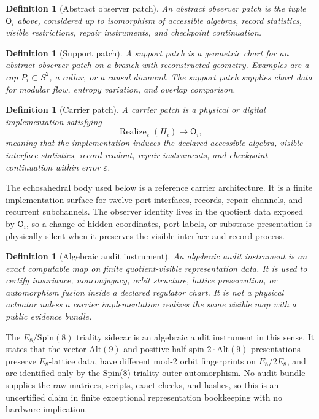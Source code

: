 \documentclass[11pt]{article}
\newtheorem{definition}[theorem]{Definition}
\theoremstyle{remark}
\theoremstyle{plain}
\begin{document}
\begin{definition}[Abstract observer patch]
An abstract observer patch is the tuple \(\mathsf O_i\) above, considered up to isomorphism of
accessible algebras, record statistics, visible restrictions, repair instruments, and checkpoint
continuation.
\end{definition}

\begin{definition}[Support patch]
A support patch is a geometric chart for an abstract observer patch on a branch with reconstructed
geometry. Examples are a cap \(P_i\subset S^2\), a collar, or a causal diamond.
The support patch supplies chart data for modular flow, entropy variation, and overlap comparison.
\end{definition}

\begin{definition}[Carrier patch]
A carrier patch is a physical or digital implementation satisfying
\[
\operatorname{Realize}_{\varepsilon}(H_i)\longrightarrow \mathsf O_i ,
\]
meaning that the implementation induces the declared accessible algebra, visible interface
statistics, record readout, repair instruments, and checkpoint continuation within error
\(\varepsilon\).
\end{definition}

The echosahedral body used below is a reference carrier architecture. It is a finite implementation
surface for twelve-port interfaces, records, repair channels, and recurrent subchannels. The
observer identity lives in the quotient data exposed by \(\mathsf O_i\), so a change of hidden
coordinates, port labels, or substrate presentation is physically silent when it preserves the
visible interface and record process.

\begin{definition}[Algebraic audit instrument]
An algebraic audit instrument is an exact computable map on finite quotient-visible representation
data. It is used to certify invariance, nonconjugacy, orbit structure, lattice preservation, or
automorphism fusion inside a declared regulator chart. It is not a physical actuator unless a
carrier implementation realizes the same visible map with a public evidence bundle.
\end{definition}

The \(E_8/\mathrm{Spin}(8)\) triality sidecar is an algebraic audit instrument in this sense. It
states that the vector \(\mathrm{Alt}(9)\) and positive-half-spin
\(2\!\cdot\!\mathrm{Alt}(9)\) presentations preserve \(E_8\)-lattice data, have different
mod-2 orbit fingerprints on \(E_8/2E_8\), and are identified only by the Spin(8) triality outer
automorphism. No audit bundle supplies the raw matrices, scripts, exact checks, and hashes, so this
is an uncertified claim in finite exceptional representation bookkeeping with no hardware
implication.
\end{document}
